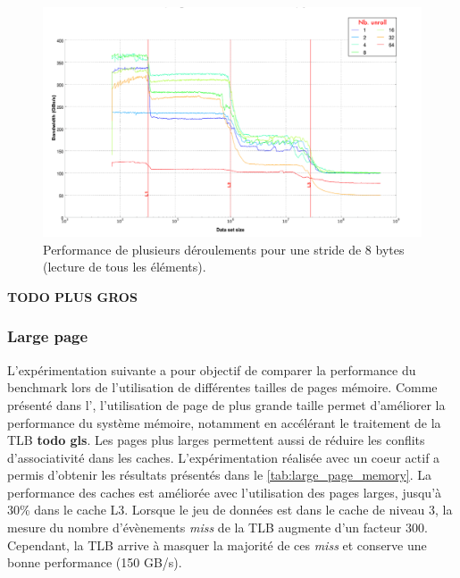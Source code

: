         \begin{figure}
        \center
        \includegraphics[width=16cm]{images/dml_unroll_best.png}
        \caption{\label{pic:dml_unroll_best} Performance de plusieurs déroulements pour une stride de 8 bytes (lecture de tous les éléments).}
        \end{figure}
        \textbf{TODO PLUS GROS}
    
    \subsubsection{Large page} \label{sec:dml_large_page}

    L'expérimentation suivante a pour objectif de comparer la performance du benchmark lors de l'utilisation de différentes tailles de pages mémoire. Comme présenté dans l', l'utilisation de page de plus grande taille permet d'améliorer la performance du système mémoire, notamment en accélérant le traitement de la TLB \textbf{todo gls}. Les pages plus larges permettent aussi de réduire les conflits d'associativité dans les caches. L'expérimentation réalisée avec un coeur actif a permis d'obtenir les résultats présentés dans le \autoref{tab:large_page_memory}. La performance des caches est améliorée avec l'utilisation des pages larges, jusqu'à 30\% dans le cache L3. Lorsque le jeu de données est dans le cache de niveau 3, la mesure du nombre d'évènements \textit{miss} de la TLB augmente d'un facteur 300. Cependant, la TLB arrive à masquer la majorité de ces \textit{miss} et conserve une bonne performance (150 GB/s).

